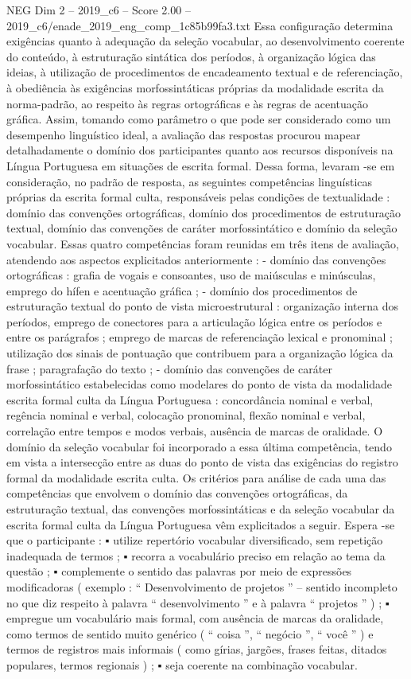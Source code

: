 \begin{textsample}{NEG Dim 2 – 2019\_c6 – Score 2.00 – 2019\_c6/enade\_2019\_eng\_comp\_1c85b99fa3.txt}
Essa configuração determina exigências quanto à adequação da seleção vocabular, ao desenvolvimento coerente do conteúdo, à estruturação sintática dos períodos, à organização lógica das ideias, à utilização de procedimentos de encadeamento textual e de referenciação, à obediência às exigências morfossintáticas próprias da modalidade escrita da norma-padrão, ao respeito às regras ortográficas e às regras de acentuação gráfica.
Assim, tomando como parâmetro o que pode ser considerado como um desempenho linguístico ideal, a avaliação das respostas procurou mapear detalhadamente o domínio dos participantes quanto aos recursos disponíveis na Língua Portuguesa em situações de escrita formal.
Dessa forma, levaram -se em consideração, no padrão de resposta, as seguintes competências linguísticas próprias da escrita formal culta, responsáveis pelas condições de textualidade : domínio das convenções ortográficas, domínio dos procedimentos de estruturação textual, domínio das convenções de caráter morfossintático e domínio da seleção vocabular.
Essas quatro competências foram reunidas em três itens de avaliação, atendendo aos aspectos explicitados anteriormente : - domínio das convenções ortográficas : grafia de vogais e consoantes, uso de maiúsculas e minúsculas, emprego do hífen e acentuação gráfica ; - domínio dos procedimentos de estruturação textual do ponto de vista microestrutural : organização interna dos períodos, emprego de conectores para a articulação lógica entre os períodos e entre os parágrafos ; emprego de marcas de referenciação lexical e pronominal ; utilização dos sinais de pontuação que contribuem para a organização lógica da frase ; paragrafação do texto ; - domínio das convenções de caráter morfossintático estabelecidas como modelares do ponto de vista da modalidade escrita formal culta da Língua Portuguesa : concordância nominal e verbal, regência nominal e verbal, colocação pronominal, flexão nominal e verbal, correlação entre tempos e modos verbais, ausência de marcas de oralidade.
O domínio da seleção vocabular foi incorporado a essa última competência, tendo em vista a intersecção entre as duas do ponto de vista das exigências do registro formal da modalidade escrita culta.
Os critérios para análise de cada uma das competências que envolvem o domínio das convenções ortográficas, da estruturação textual, das convenções morfossintáticas e da seleção vocabular da escrita formal culta da Língua Portuguesa vêm explicitados a seguir.
Espera -se que o participante : {\EmojiFont ▪} utilize repertório vocabular diversificado, sem repetição inadequada de termos ; {\EmojiFont ▪} recorra a vocabulário preciso em relação ao tema da questão ; {\EmojiFont ▪} complemente o sentido das palavras por meio de expressões modificadoras ( exemplo : “ Desenvolvimento de projetos ” – sentido incompleto no que diz respeito à palavra “ desenvolvimento ” e à palavra “ projetos ” ) ; {\EmojiFont ▪} empregue um vocabulário mais formal, com ausência de marcas da oralidade, como termos de sentido muito genérico ( “ coisa ”, “ negócio ”, “ você ” ) e termos de registros mais informais ( como gírias, jargões, frases feitas, ditados populares, termos regionais ) ; {\EmojiFont ▪} seja coerente na combinação vocabular.

\end{textsample}
